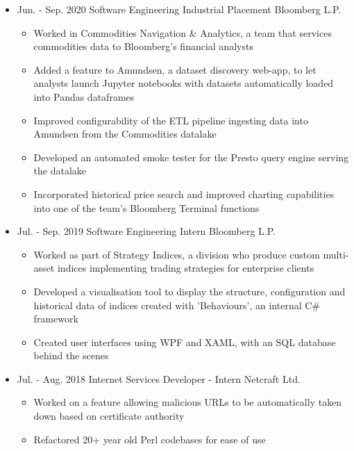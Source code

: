 \documentclass[11pt,a4paper,sans]{moderncv}        %
\begin{document}
\begin{itemize}

\item{
\cventry
{Jun. - Sep. 2020}
{Software Engineering Industrial Placement}
{Bloomberg L.P.}
{}{}{
\begin{itemize}
\item Worked in Commodities Navigation \& Analytics, a team that services commodities data to Bloomberg's financial analysts
\item Added a feature to Amundsen, a dataset discovery web-app, to let analysts launch Jupyter notebooks with datasets automatically loaded into Pandas dataframes
\item Improved configurability of the ETL pipeline ingesting data into Amundsen from the Commodities datalake
\item Developed an automated smoke tester for the Presto query engine serving the datalake
\item Incorporated historical price search and improved charting capabilities into one of the team's Bloomberg Terminal functions
\end{itemize}
}}

\item{
\cventry
{Jul. - Sep. 2019}
{Software Engineering Intern}
{Bloomberg L.P.}
{}{}{
\begin{itemize}
\item Worked as part of Strategy Indices, a division who produce custom multi-asset indices implementing trading strategies for enterprise clients
\item Developed a visualisation tool to display the structure, configuration and historical data of indices created with 'Behaviours', an internal C\# framework
\item Created user interfaces using WPF and XAML, with an SQL database behind the scenes
\end{itemize}
}}

\item{
\cventry
{Jul. - Aug. 2018}
{Internet Services Developer - Intern}
{Netcraft Ltd.}
{}{}{
\begin{itemize}
\item Worked on a feature allowing malicious URLs to be automatically taken down based on certificate authority
\item Refactored 20+ year old  Perl codebases for ease of use
\end{itemize}
}}

\end{itemize}
\end{document}
